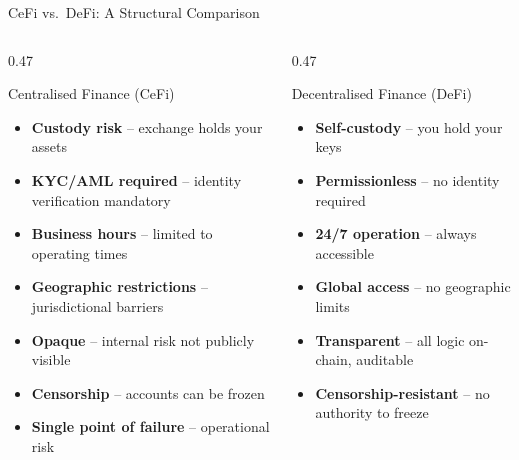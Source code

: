 \documentclass[8pt,aspectratio=169]{beamer}
\begin{document}
\begin{frame}{CeFi vs.\ DeFi: A Structural Comparison}
  \begin{columns}[T]
    \begin{column}{0.47\textwidth}
      \begin{block}{\textcolor{mlred}{Centralised Finance (CeFi)}}
        \begin{itemize}\setlength\itemsep{3pt}
          \item[\textcolor{mlred}{$\times$}] \textbf{Custody risk} -- exchange holds your assets
          \item[\textcolor{mlred}{$\times$}] \textbf{KYC/AML required} -- identity verification mandatory
          \item[\textcolor{mlred}{$\times$}] \textbf{Business hours} -- limited to operating times
          \item[\textcolor{mlred}{$\times$}] \textbf{Geographic restrictions} -- jurisdictional barriers
          \item[\textcolor{mlred}{$\times$}] \textbf{Opaque} -- internal risk not publicly visible
          \item[\textcolor{mlred}{$\times$}] \textbf{Censorship} -- accounts can be frozen
          \item[\textcolor{mlred}{$\times$}] \textbf{Single point of failure} -- operational risk
        \end{itemize}
      \end{block}
    \end{column}
    \begin{column}{0.47\textwidth}
      \begin{block}{\textcolor{mlgreen}{Decentralised Finance (DeFi)}}
        \begin{itemize}\setlength\itemsep{3pt}
          \item[\textcolor{mlgreen}{$\checkmark$}] \textbf{Self-custody} -- you hold your keys
          \item[\textcolor{mlgreen}{$\checkmark$}] \textbf{Permissionless} -- no identity required
          \item[\textcolor{mlgreen}{$\checkmark$}] \textbf{24/7 operation} -- always accessible
          \item[\textcolor{mlgreen}{$\checkmark$}] \textbf{Global access} -- no geographic limits
          \item[\textcolor{mlgreen}{$\checkmark$}] \textbf{Transparent} -- all logic on-chain, auditable
          \item[\textcolor{mlgreen}{$\checkmark$}] \textbf{Censorship-resistant} -- no authority to freeze

\end{itemize}
\end{block}
\end{column}
\end{columns}
\end{frame}
\end{document}
